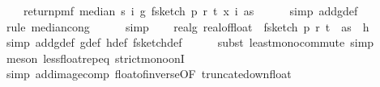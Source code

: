 \begin{isabellebody}
\ \ \ \ return{\isacharunderscore}{\kern0pt}pmf\ {\isacharparenleft}{\kern0pt}median\ s\ {\isacharparenleft}{\kern0pt}{\isasymlambda}i{\isachardot}{\kern0pt}\ g\ {\isacharparenleft}{\kern0pt}f{}{\isacharunderscore}{\kern0pt}sketch\ p\ r\ t\ {\isacharparenleft}{\kern0pt}x\ i{\isacharparenright}{\kern0pt}\ as{\isacharparenright}{\kern0pt}{\isacharparenright}{\kern0pt}{\isacharparenright}{\kern0pt}{\isachardoublequoteclose}\isanewline
\ \ \ \ \isamarkupfalse%
\ {\isacharparenleft}{\kern0pt}simp\ add{\isacharcolon}{\kern0pt}g{\isacharunderscore}{\kern0pt}def{\isacharparenright}{\kern0pt}\isanewline
\ \ \ \ \isamarkupfalse%
\ {\isacharparenleft}{\kern0pt}rule\ median{\isacharunderscore}{\kern0pt}cong{\isacharparenright}{\kern0pt}\isanewline
\ \ \ \ \isamarkupfalse%
\ simp\isanewline
\isanewline
\ \ \isamarkupfalse%
\ real{\isacharunderscore}{\kern0pt}g{\isacharunderscore}{\kern0pt}{}{\isacharcolon}{\kern0pt}{\isachardoublequoteopen}{\isasymAnd}{\isasymomega}{\isachardot}{\kern0pt}\ real{\isacharunderscore}{\kern0pt}of{\isacharunderscore}{\kern0pt}float\ {\isacharbackquote}{\kern0pt}\ f{}{\isacharunderscore}{\kern0pt}sketch\ p\ r\ t\ {\isasymomega}\ as\ {\isacharequal}{\kern0pt}\ h\ {\isasymomega}{\isachardoublequoteclose}\ \isanewline
\ \ \ \ \isamarkupfalse%
\ {\isacharparenleft}{\kern0pt}simp\ add{\isacharcolon}{\kern0pt}g{\isacharunderscore}{\kern0pt}def\ g{\isacharprime}{\kern0pt}{\isacharunderscore}{\kern0pt}def\ h{\isacharunderscore}{\kern0pt}def\ f{}{\isacharunderscore}{\kern0pt}sketch{\isacharunderscore}{\kern0pt}def{\isacharparenright}{\kern0pt}\isanewline
\ \ \ \ \isamarkupfalse%
\ {\isacharparenleft}{\kern0pt}subst\ least{\isacharunderscore}{\kern0pt}mono{\isacharunderscore}{\kern0pt}commute{\isacharcomma}{\kern0pt}\ simp{\isacharparenright}{\kern0pt}\isanewline
\ \ \ \ \ \isamarkupfalse%
\ {\isacharparenleft}{\kern0pt}meson\ less{\isacharunderscore}{\kern0pt}float{\isachardot}{\kern0pt}rep{\isacharunderscore}{\kern0pt}eq\ strict{\isacharunderscore}{\kern0pt}mono{\isacharunderscore}{\kern0pt}onI{\isacharparenright}{\kern0pt}\isanewline
\ \ \ \ \isamarkupfalse%
\ {\isacharparenleft}{\kern0pt}simp\ add{\isacharcolon}{\kern0pt}image{\isacharunderscore}{\kern0pt}comp\ float{\isacharunderscore}{\kern0pt}of{\isacharunderscore}{\kern0pt}inverse{\isacharbrackleft}{\kern0pt}OF\ truncate{\isacharunderscore}{\kern0pt}down{\isacharunderscore}{\kern0pt}float{\isacharbrackright}{\kern0pt}{\isacharparenright}{\kern0pt}\isanewline

\end{isabellebody}
